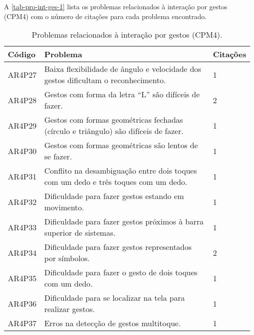 A \autoref{tab-pro-int-ges-1} lista os problemas relacionados à interação por gestos (CPM4) com o número de citações para cada problema encontrado.

\begin{table}[htb]
  \begin{center}
    \ABNTEXfontereduzida
    \caption{Problemas relacionados à interação por gestos (CPM4).}
    \label{tab-pro-int-ges-1}
    \begin{tabular}{p{1.2cm}|p{12.0cm}|p{1.2cm}}
      \textbf{Código} & \textbf{Problema}                                                                   & \textbf{Citações} \\
      \hline
      AR4P27          & Baixa flexibilidade de ângulo e velocidade dos gestos dificultam o reconhecimento.  & 1                 \\
      \hline
      AR4P28          & Gestos com forma da letra “L” são difíceis de fazer.                                & 2                 \\
      \hline
      AR4P29          & Gestos com formas geométricas fechadas (círculo e triângulo) são difíceis de fazer. & 1                 \\
      \hline
      AR4P30          & Gestos com formas geométricas são lentos de se fazer.                               & 1                 \\
      \hline
      AR4P31          & Conflito na desambiguação entre dois toques com um dedo e três toques com um dedo.  & 1                 \\
      \hline
      AR4P32          & Dificuldade para fazer gestos estando em movimento.                                 & 1                 \\
      \hline
      AR4P33          & Dificuldade para fazer gestos próximos à barra superior de sistemas.                & 1                 \\
      \hline
      AR4P34          & Dificuldade para fazer gestos representados por símbolos.                           & 2                 \\
      \hline
      AR4P35          & Dificuldade para fazer o gesto de dois toques com um dedo.                          & 1                 \\
      \hline
      AR4P36          & Dificuldade para se localizar na tela para realizar gestos.                         & 1                 \\
      \hline
      AR4P37          & Erros na detecção de gestos multitoque.                                             & 1                 \\

\end{tabular}
\end{center}
\end{table}
